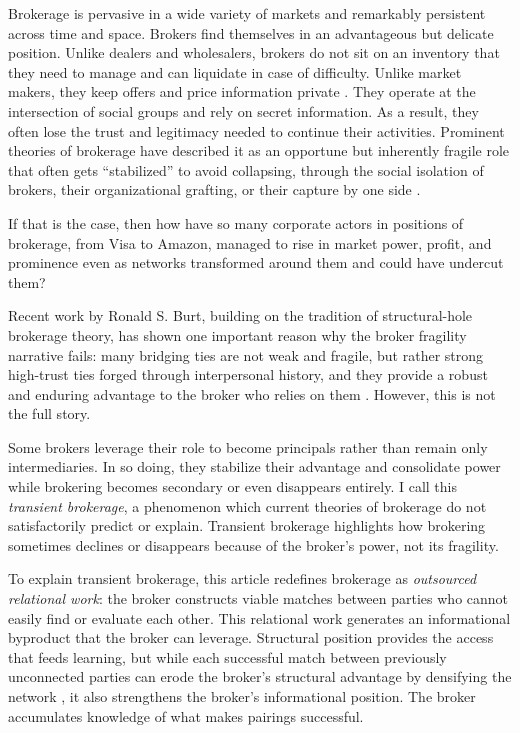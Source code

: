 \documentclass[
]{article}
\begin{document}
Brokerage is pervasive in a wide variety of markets and remarkably persistent across time and space. Brokers find themselves in an advantageous but delicate position. Unlike dealers and wholesalers, brokers do not sit on an inventory that they need to manage and can liquidate in case of difficulty. Unlike market makers, they keep offers and price information private \autocite{rustMiddlemenMarketMakers2003}. They operate at the intersection of social groups \autocite{burtStructuralHolesSocial1992,burtStructuralHolesGood2004} and rely on secret information. As a result, they often lose the trust and legitimacy needed to continue their activities. Prominent theories of brokerage have described it as an opportune but inherently fragile role that often gets ``stabilized'' to avoid collapsing, through the social isolation of brokers, their organizational grafting, or their capture by one side \autocite{stovelStabilizingBrokerage2011}.

If that is the case, then how have so many corporate actors in positions of brokerage, from Visa to Amazon, managed to rise in market power, profit, and prominence even as networks transformed around them and could have undercut them?

Recent work by Ronald S. Burt, building on the tradition of structural-hole brokerage theory, has shown one important reason why the broker fragility narrative fails: many bridging ties are not weak and fragile, but rather strong high-trust ties forged through interpersonal history, and they provide a robust and enduring advantage to the broker who relies on them \autocite{burtFragileBrokerage,burtStrongBridgesTrust2026a}. However, this is not the full story.

Some brokers leverage their role to become principals rather than remain only intermediaries. In so doing, they stabilize their advantage and consolidate power while brokering becomes secondary or even disappears entirely. I call this \emph{transient brokerage}, a phenomenon which current theories of brokerage do not satisfactorily predict or explain. Transient brokerage highlights how brokering sometimes declines or disappears because of the broker's power, not its fragility.

To explain transient brokerage, this article redefines brokerage as \emph{outsourced relational work}: the broker constructs viable matches between parties who cannot easily find or evaluate each other. This relational work generates an informational byproduct that the broker can leverage. Structural position provides the access that feeds learning, but while each successful match between previously unconnected parties can erode the broker's structural advantage by densifying the network \autocite[356]{burtNetworkStructureSocial2000}, it also strengthens the broker's informational position. The broker accumulates knowledge of what makes pairings successful.
\end{document}
